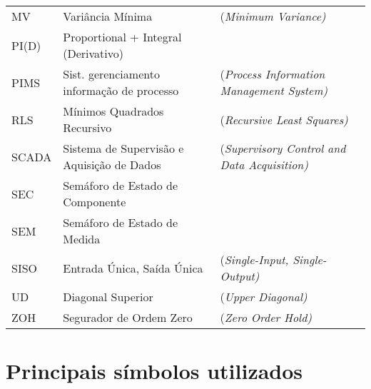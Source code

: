 \begin{tabular}{ l l l }
MV 		& Variância Mínima 					&(\it{Minimum Variance}) 				\\ 
PI(D) 	& Proportional + Integral (Derivativo) 	&								\\ 
PIMS	& Sist. gerenciamento informação de processo 		& (\it{Process Information Management System})\\
RLS 		&  Mínimos Quadrados Recursivo 		&(\it{Recursive Least Squares}) 		\\ 
SCADA	& Sistema de Supervisão e Aquisição de Dados	& (\it{Supervisory Control and Data Acquisition}) 						 		\\ 
SEC		& Semáforo de Estado de Componente	& 						 		\\ 
SEM		& Semáforo de Estado de Medida		& 						 		\\ 
SISO 	& Entrada Única, Saída Única 			&(\it{Single-Input, Single-Output}) 		\\ 
UD		& Diagonal Superior					&(\it{Upper Diagonal})				\\
ZOH 	& Segurador de Ordem Zero 			&(\it{Zero Order Hold}) 				\\ 
\end{tabular}

\section{Principais símbolos utilizados}

